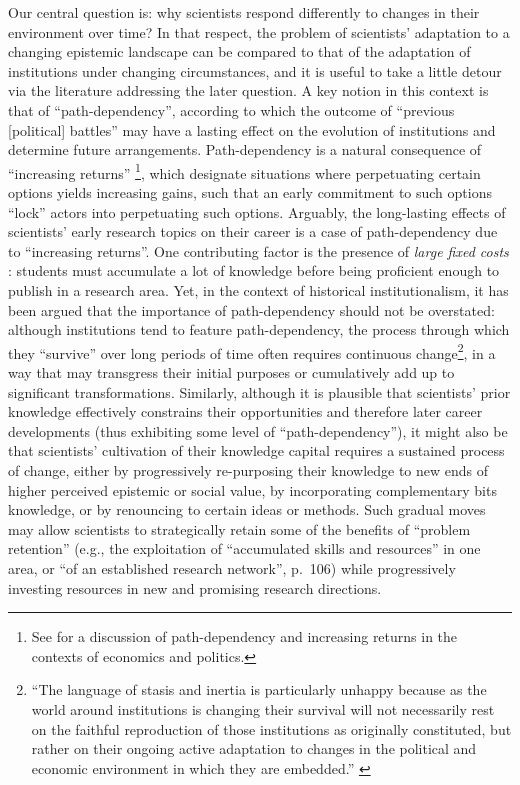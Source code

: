 \documentclass{article}
\begin{document}
Our central question is: why scientists respond differently to changes in their environment over time?  In that respect, the problem of scientists' adaptation to a changing epistemic landscape can be compared to that of the adaptation of institutions under changing circumstances, and it is useful to take a little detour via the literature addressing the later question.  A key notion in this context is that of ``path-dependency'', according to which the outcome of ``previous [political] battles'' may have a lasting effect on the evolution of institutions and determine future arrangements. Path-dependency is a natural consequence of ``increasing returns'' \footnote{See \citealt{Pierson2000} for a discussion of path-dependency and increasing returns in the contexts of economics and politics.}, which designate situations where perpetuating certain options yields increasing gains, such that an early commitment to such options ``lock'' actors into perpetuating such options. Arguably, the long-lasting effects of scientists' early research topics on their career is a case of path-dependency due to ``increasing returns''. One contributing factor is the presence of \textit{large fixed costs} \citep{Pierson2000}: students must accumulate a lot of knowledge before being proficient enough to publish in a research area. Yet, in the context of historical institutionalism, it has been argued that the importance of path-dependency should not be overstated: although institutions tend to feature path-dependency, the process through which they ``survive'' over long periods of time often requires continuous change\footnote{``The language of stasis and inertia is particularly unhappy because as the world around institutions is changing their survival will not necessarily rest on the faithful reproduction of those institutions as originally constituted, but rather on their ongoing active adaptation to changes in the political and economic environment in which they are embedded.'' \citep[p.~293]{Thelen2004}}, in a way that may transgress their initial purposes or cumulatively add up to significant transformations. Similarly, although it is plausible that scientists' prior knowledge effectively constrains their opportunities and therefore later career developments (thus exhibiting some level of ``path-dependency''), it might also be that scientists' cultivation of their knowledge capital requires a sustained process of change, either by progressively re-purposing their knowledge to new ends of higher perceived epistemic or social value, by incorporating complementary bits knowledge, or by renouncing to certain ideas or methods. Such gradual moves may allow scientists to strategically retain some of  the benefits of ``problem retention'' (e.g., the exploitation of ``accumulated skills and resources'' in one area, or ``of an established research network'', p.~106) while progressively investing resources in new and promising research directions. 
\end{document}
